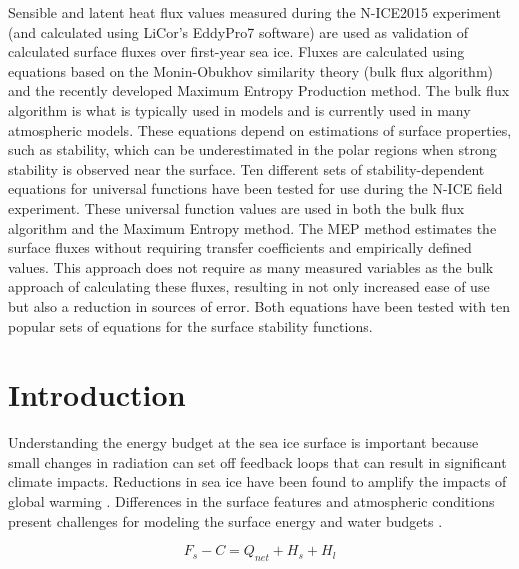 \begin{spacing}{1} \noindent Sensible and latent heat flux values measured during the N-ICE2015 experiment (and calculated using LiCor’s EddyPro7 software) are used as validation of calculated surface fluxes over first-year sea ice. Fluxes are calculated using equations based on the Monin-Obukhov similarity theory (bulk flux algorithm) and the recently developed Maximum Entropy Production method. The bulk flux algorithm is what is typically used in models and is currently used in many atmospheric models. These equations depend on estimations of surface properties, such as stability, which can be underestimated in the polar regions when strong stability is observed near the surface. Ten different sets of stability-dependent equations for universal functions have been tested for use during the N-ICE field experiment. These universal function values are used in both the bulk flux algorithm and the Maximum Entropy method. The MEP method estimates the surface fluxes without requiring transfer coefficients and empirically defined values. This approach does not require as many measured variables as the bulk approach of calculating these fluxes, resulting in not only increased ease of use but also a reduction in sources of error. Both equations have been tested with ten popular sets of equations for the surface stability functions. 
\end{spacing}

\doublespacing
\section{Introduction}

Understanding the energy budget at the sea ice surface is important because small changes in radiation can set off feedback loops that can result in significant climate impacts. Reductions in sea ice have been found to amplify the impacts of global warming \citep{wunderling:2020} \citep{ipcc_techsum}. Differences in the surface features and atmospheric conditions present challenges for modeling the surface energy and water budgets \citep{wang:2009}. 

\begin{equation}\label{eq:seb}
F_{s} - C = Q_{net} + H_{s} + H_{l}
\end{equation}

